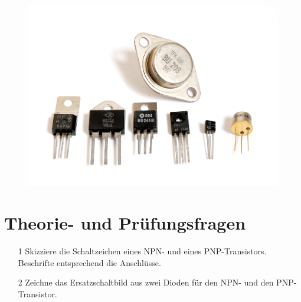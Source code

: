 

\begin{figure}
 \vspace{-6cm}
  \includegraphics[scale=0.4]{Transistor/Bilder/Transistors-white.jpg}
 \vspace{-6cm}
\end{figure}

\section*{Theorie- und Prüfungsfragen}

\begin{enumerate}
\itemsep1pt\parskip0pt
\item[1] Skizziere die Schaltzeichen eines NPN- und eines PNP-Transistors. Beschrifte  entsprechend die Anschlüsse.
\item[2] Zeichne das Ersatzschaltbild aus zwei Dioden für den NPN- und den PNP-Transistor.
\end{enumerate}


